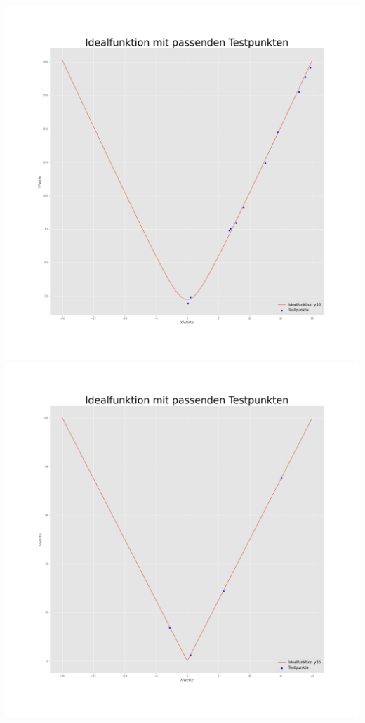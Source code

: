 \documentclass[
    a4paper, 								%
    oneside, 								%
    11pt, 									%
    listof=totoc, 					%
    bibliography=totoc, 		%
    final, 									%
    numbers=noenddot
]{scrreprt}
\begin{document}
\newpage
\includegraphics[width=1\textwidth]{Idealfuntionfunktion_y33_Testpunkte}
\newpage
\includegraphics[width=1\textwidth]{Idealfuntionfunktion_y36_Testpunkte}
\end{document}
